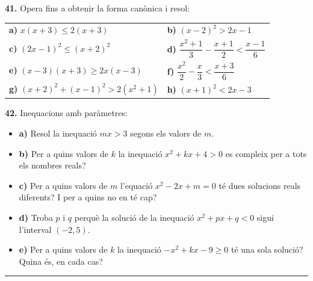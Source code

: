 \documentclass[13pt,a4paper]{extarticle}
\begin{document}
\par\noindent\begin{minipage}{\linewidth}
\textbf{41.} Opera fins a obtenir la forma canònica i resol:\par


\begin{tabular}{@{}p{.46\linewidth}p{.46\linewidth}@{}}
\textbf{a)} $x(x+3)\leq 2(x+3)$ & \textbf{b)} $(x-2)^2>2x-1$ \\[3pt]
\textbf{c)} $(2x-1)^2\leq(x+2)^2$ & \textbf{d)} $\dfrac{x^2+1}{3}-\dfrac{x+1}{2}<\dfrac{x-1}{6}$ \\[9pt]
\textbf{e)} $(x-3)(x+3)\geq 2x(x-3)$ & \textbf{f)} $\dfrac{x^2}{2}-\dfrac{x}{3}<\dfrac{x+3}{6}$ \\[9pt]
\textbf{g)} $(x+2)^2+(x-1)^2>2(x^2+1)$ & \textbf{h)} $(x+1)^2<2x-3$ \\[3pt]
\end{tabular}\par
\end{minipage}\par\vspace{1.6mm}
\par\noindent\begin{minipage}{\linewidth}
\textbf{42.} Inequacions amb paràmetres:\par

\begin{itemize}[leftmargin=0pt,itemsep=6pt,topsep=4pt,parsep=0pt,label={}]
\item \textbf{a)} Resol la inequació $mx>3$ segons els valors de $m$.
\item \textbf{b)} Per a quins valors de $k$ la inequació $x^2+kx+4>0$ es compleix per a tots els nombres reals?
\item \textbf{c)} Per a quins valors de $m$ l'equació $x^2-2x+m=0$ té dues solucions reals diferents? I per a quins no en té cap?
\item \textbf{d)} Troba $p$ i $q$ perquè la solució de la inequació $x^2+px+q<0$ sigui l'interval $(-2,5)$.
\item \textbf{e)} Per a quins valors de $k$ la inequació $-x^2+kx-9\geq 0$ té una sola solució? Quina és, en cada cas?
\end{itemize}
\end{minipage}\par\vspace{1.6mm}

\vspace{1mm}\hrule\vspace{3mm}
\end{document}
